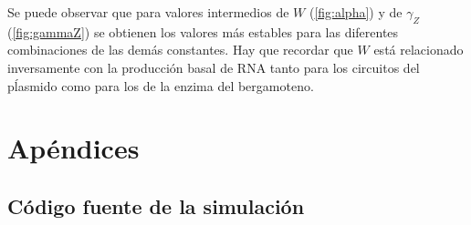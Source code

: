 \documentclass[12pt]{article}
\begin{document}
Se puede observar que para valores intermedios de $W$ (\ref{fig:alpha}) y de $\gamma _Z$ (\ref{fig:gammaZ}) se obtienen los valores m\'as estables para las diferentes combinaciones de las dem\'as constantes. Hay que recordar que $W$ est\'a relacionado inversamente con la producci\'on basal de RNA tanto para los circuitos del p\'lasmido como para los de la enzima del bergamoteno.

\appendix
\section{Ap\'endices}
\subsection{C\'odigo fuente de la simulaci\'on}
\label{sec:code}



\end{document}
